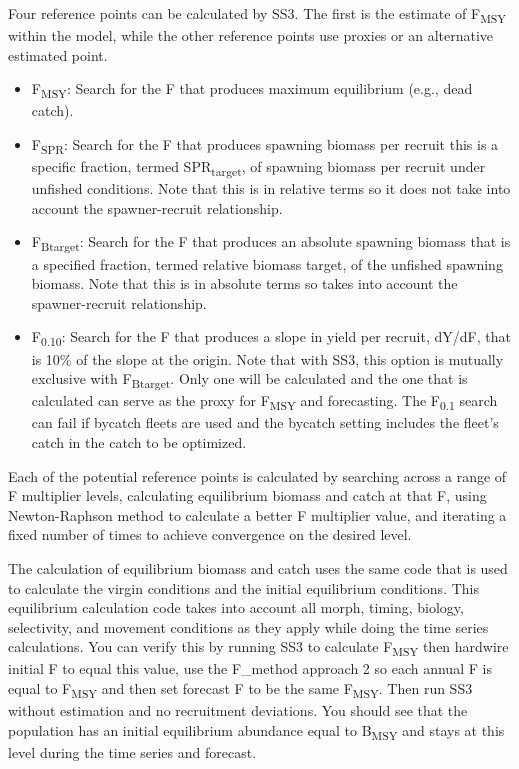 Four reference points can be calculated by SS3. The first is the estimate of F\textsubscript{MSY} within the model, while the other reference points use proxies or an alternative estimated point.

\begin{itemize}
	\item F\textsubscript{MSY}: Search for the F that produces maximum equilibrium (e.g., dead catch).
	
	\item F\textsubscript{SPR}: Search for the F that produces spawning biomass per recruit this is a specific fraction, termed SPR\textsubscript{target}, of spawning biomass per recruit under unfished conditions. Note that this is in relative terms so it does not take into account the spawner-recruit relationship.
	
	\item F\textsubscript{Btarget}: Search for the F that produces an absolute spawning biomass that is a specified fraction, termed relative biomass target, of the unfished spawning biomass. Note that this is in absolute terms so takes into account the spawner-recruit relationship. 
	
	\item F\textsubscript{0.10}: Search for the F that produces a slope in yield per recruit, dY/dF, that is 10\% of the slope at the origin. Note that with SS3, this option is mutually exclusive with F\textsubscript{Btarget}. Only one will be calculated and the one that is calculated can serve as the proxy for F\textsubscript{MSY} and forecasting. The F\textsubscript{0.1} search can fail if bycatch fleets are used and the bycatch setting includes the fleet's catch in the catch to be optimized.
\end{itemize}

Each of the potential reference points is calculated by searching across a range of F multiplier levels, calculating equilibrium biomass and catch at that F, using Newton-Raphson method to calculate a better F multiplier value, and iterating a fixed number of times to achieve convergence on the desired level.

The calculation of equilibrium biomass and catch uses the same code that is used to calculate the virgin conditions and the initial equilibrium conditions. This equilibrium calculation code takes into account all morph, timing, biology, selectivity, and movement conditions as they apply while doing the time series calculations. You can verify this by running SS3 to calculate F\textsubscript{MSY} then hardwire initial F to equal this value, use the F\_method approach 2 so each annual F is equal to F\textsubscript{MSY} and then set forecast F to be the same F\textsubscript{MSY}. Then run SS3 without estimation and no recruitment deviations. You should see that the population has an initial equilibrium abundance equal to B\textsubscript{MSY} and stays at this level during the time series and forecast.

